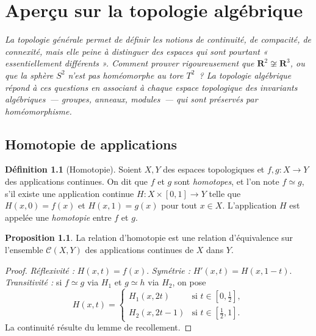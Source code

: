 \documentclass[12pt,a4paper,openany]{book}
\theoremstyle{definition}
\newtheorem{definition}{Définition}[chapter]
\theoremstyle{cours}
\newtheorem{proposition}[theoreme]{Proposition}
\theoremstyle{coursnormal}
\begin{document}
\chapter{Aperçu sur la topologie algébrique}
\label{chap:topologie-algebrique}

\medskip
\noindent
\textit{La topologie générale permet de définir les notions de continuité,
de compacité, de connexité, mais elle peine à distinguer des espaces
qui sont pourtant « essentiellement différents ». Comment prouver
rigoureusement que $\mathbf{R}^2\not\cong\mathbf{R}^3$, ou que la
sphère $S^2$ n'est pas homéomorphe au tore $T^2$~? La topologie
algébrique répond à ces questions en associant à chaque espace
topologique des invariants algébriques~--- groupes, anneaux, modules~---
qui sont préservés par homéomorphisme.}

\section{Homotopie de applications}
\label{sec:homotopie}

\begin{definition}[Homotopie]
\label{def:homotopie}
Soient $X,Y$ des espaces topologiques et $f,g\colon X\to Y$ des
applications continues. On dit que $f$ et $g$ sont \emph{homotopes},
et l'on note $f\simeq g$, s'il existe une application continue
$H\colon X\times[0,1]\to Y$ telle que $H(x,0)=f(x)$ et $H(x,1)=g(x)$
pour tout $x\in X$. L'application $H$ est appelée une \emph{homotopie}
entre $f$ et $g$.
\end{definition}

\begin{proposition}
\label{prop:homotopie-equivalence}
La relation d'homotopie est une relation d'équivalence sur l'ensemble
$\mathcal{C}(X,Y)$ des applications continues de $X$ dans $Y$.
\end{proposition}

\begin{proof}
\emph{Réflexivité :} $H(x,t)=f(x)$. \emph{Symétrie :}
$H'(x,t)=H(x,1-t)$. \emph{Transitivité :} si $f\simeq g$ via $H_1$
et $g\simeq h$ via $H_2$, on pose
\[
H(x,t)=\begin{cases} H_1(x,2t) & \text{si } t\in[0,\tfrac{1}{2}],\\
  H_2(x,2t-1) & \text{si } t\in[\tfrac{1}{2},1]. \end{cases}
\]
La continuité résulte du lemme de recollement.
\end{proof}
\end{document}
